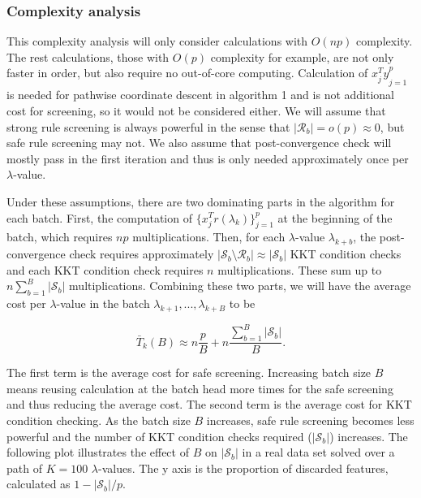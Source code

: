 \documentclass{article}
\begin{document}
\subsubsection{Complexity analysis}

This complexity analysis will only consider calculations with $O(np)$ complexity. The rest calculations, those with $O(p)$ complexity for example, are not only faster in order, but also require no out-of-core computing. Calculation of ${x_j^Ty}_{j=1}^p$ is needed for pathwise coordinate descent in algorithm 1 and is not additional cost for screening, so it would not be considered either. We will assume that strong rule screening is always powerful in the sense that $|\mathcal{R}_b|=o(p)\approx0$, but safe rule screening may not. We also assume that post-convergence check will mostly pass in the first iteration and thus is only needed approximately once per $\lambda$-value.

Under these assumptions, there are two dominating parts in the algorithm for each batch. First, the computation of $\{x_j^Tr(\lambda_k)\}_{j=1}^p$ at the beginning of the batch, which requires $np$ multiplications. Then, for each $\lambda$-value $\lambda_{k+b}$, the post-convergence check requires approximately $|\mathcal{S}_b\setminus\mathcal{R}_b|\approx|\mathcal{S}_b|$ KKT condition checks and each KKT condition check requires $n$ multiplications. These sum up to $n\sum_{b=1}^B|\mathcal{S}_b|$ multiplications. Combining these two parts, we will have the average cost per $\lambda$-value in the batch $\lambda_{k+1},...,\lambda_{k+B}$ to be

\begin{equation}
    \bar{T}_k(B) \approx n\frac{p}{B}+n\frac{\sum_{b=1}^B|\mathcal{S}_b|}{B}.
\end{equation}

The first term is the average cost for safe screening. Increasing batch size $B$ means reusing calculation at the batch head more times for the safe screening and thus reducing the average cost. The second term is the average cost for KKT condition checking. As the batch size $B$ increases, safe rule screening becomes less powerful and the number of KKT condition checks required ($|\mathcal{S}_b|$) increases. The following plot illustrates the effect of $B$ on $|\mathcal{S}_b|$ in a real data set solved over a path of $K=100$ $\lambda$-values. The y axis is the proportion of discarded features, calculated as $1-|\mathcal{S}_b|/p$.
\end{document}

